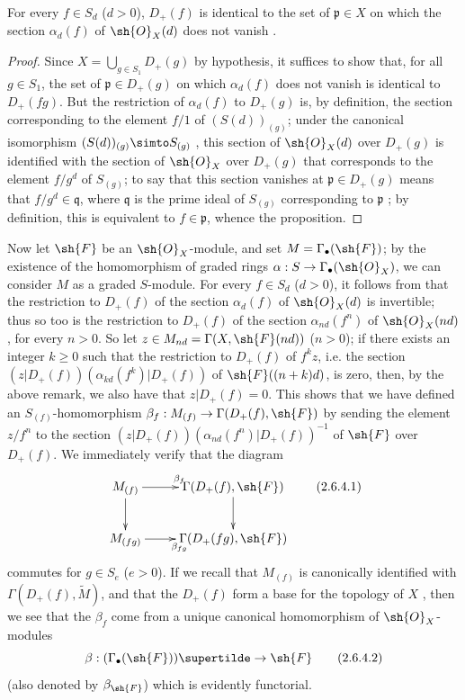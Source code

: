 \begin{proposition}[2.6.3]
\label{II.2.6.3}
For every $f\in S_d$ ($d>0$), $D_+(f)$ is identical to the set of $\mathfrak{p}\in X$ on which the section $\alpha_d(f)$ of $\sh{O}_X(d)$ does not vanish .
\end{proposition}

\begin{proof}
Since $X=\bigcup_{g\in S_1}D_+(g)$ by hypothesis, it suffices to show that, for all $g\in S_1$, the set of $\mathfrak{p}\in D_+(g)$ on which $\alpha_d(f)$ does not vanish is identical to $D_+(fg)$.
But the restriction of $\alpha_d(f)$ to $D_+(g)$ is, by definition, the section corresponding to the element $f/1$ of $(S(d))_{(g)}$;
under the canonical isomorphism $(S(d))_{(g)}\simto S_{(g)}$ , this section of $\sh{O}_X(d)$ over $D_+(g)$ is identified with the section of $\sh{O}_X$ over $D_+(g)$ that corresponds to the element $f/g^d$ of $S_{(g)}$;
to say that this section vanishes at $\mathfrak{p}\in D_+(g)$ means that $f/g^d\in\mathfrak{q}$, where $\mathfrak{q}$ is the prime ideal of $S_{(g)}$ corresponding to $\mathfrak{p}$ ;
by definition, this is equivalent to $f\in\mathfrak{p}$, whence the proposition.
\end{proof}

\begin{env}[2.6.4]
\label{II.2.6.4}
Now let $\sh{F}$ be an $\sh{O}_X$-module, and set $M=\Gamma_\bullet(\sh{F})$;
by the existence of the homomorphism of graded rings $\alpha: S\to\Gamma_\bullet(\sh{O}_X)$, we can consider $M$ as a graded $S$-module.
For every $f\in S_d$ ($d>0$), it follows from  that the restriction to $D_+(f)$ of the section $\alpha_d(f)$ of $\sh{O}_X(d)$ is invertible;
thus so too is the restriction to $D_+(f)$ of the section $\alpha_{nd}(f^n)$ of $\sh{O}_X(nd)$, for every $n>0$.
So let $z\in M_{nd}=\Gamma(X,\sh{F}(nd))$ ($n>0$);
if there exists an integer $k\geq0$ such that the restriction to $D_+(f)$ of $f^kz$, i.e. the
  section $(z|D_+(f))(\alpha_{kd}(f^k)|D_+(f))$ of $\sh{F}((n+k)d)$, is zero, then, by the above remark, we also have that $z|D_+(f)=0$.
This shows that we have defined an $S_{(f)}$-homomorphism $\beta_f: M_{(f)}\to\Gamma(D_+(f),\sh{F})$ by sending the element $z/f^n$ to the section $(z|D_+(f))(\alpha_{nd}(f^n)|D_+(f))^{-1}$ of $\sh{F}$ over $D_+(f)$.
We immediately verify that the diagram
\[
\label{II.2.6.4.1}
  \xymatrix{
    M_{(f)} \ar[r]^{\beta_f} \ar[d]
    & \Gamma(D_+(f),\sh{F}) \ar[d]
  \\M_{(fg)} \ar[r]_{\beta_{fg}}
    & \Gamma(D_+(fg),\sh{F})
  }
\tag{2.6.4.1}
\]
commutes for $g\in S_e$ ($e>0$).
If we recall that $M_{(f)}$ is canonically identified with $\Gamma(D_+(f),\widetilde{M})$, and that the $D_+(f)$ form a base for the topology of $X$ , then we see that the $\beta_f$ come from a unique canonical homomorphism of $\sh{O}_X$-modules
\[
\label{II.2.6.4.2}
  \beta:(\Gamma_\bullet(\sh{F}))\supertilde\to\sh{F}
\tag{2.6.4.2}
\]
(also denoted by $\beta_{\sh{F}}$) which is evidently functorial.
\end{env}

